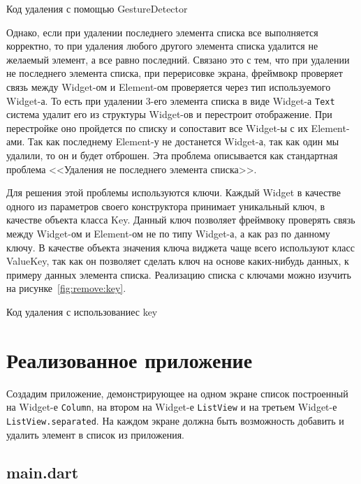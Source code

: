 \begin{image}
	\caption{Код удаления с помощью GestureDetector}
	\label{fig:remove}
\end{image}

Однако, если при удалении последнего элемента списка все выполняется корректно,
то при удаления любого другого элемента списка удалится не желаемый элемент,
а все равно последний.
Связано это с тем, что при удалении не последнего элемента списка,
при перерисовке экрана, фреймвокр проверяет связь между Widget-ом
и Element-ом проверяется через тип используемого Widget-а.
То есть при удалении 3-его элемента списка в виде Widget-а \texttt{Text}
система удалит его из структуры Widget-ов и перестроит отображение.
При перестройке оно пройдется по списку
и сопоставит все Widget-ы с их Element-ами.
Так как последнему Element-у не достанется Widget-а,
так как один мы удалили, то он и будет отброшен.
Эта проблема описывается как стандартная проблема
<<Удаления не последнего элемента списка>>.\par
Для решения этой проблемы используются ключи.
Каждый Widget в качестве одного из параметров своего конструктора принимает
уникальный ключ, в качестве объекта класса Key.
Данный ключ позволяет фреймвоку проверять связь между Widget-ом
и Element-ом не по типу Widget-а, а как раз по данному ключу.
В качестве объекта значения ключа виджета чаще всего используют класс ValueKey,
так как он позволяет сделать ключ на основе каких-нибудь данных,
к примеру данных элемента списка.
Реализацию списка с ключами можно изучить на рисунке~\ref{fig:remove:key}.

\begin{image}
	\caption{Код удаления с использованиес key}
	\label{fig:remove:key}
\end{image}

\clearpage

\section{Реализованное приложение}

Создадим приложение, демонстрирующее на одном экране список
построенный на Widget-е \texttt{Column},
на втором на Widget-е \texttt{ListView}
и на третьем Widget-е \texttt{ListView.separated}.
На каждом экране должна быть возможность добавить
и удалить элемент в список из приложения.

\subsection{main.dart}

